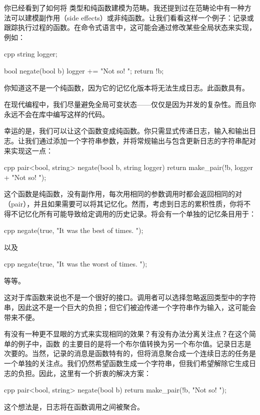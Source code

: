 
\lettrine[lhang=0.17]{你}{已经看到了如何将} 类型和纯函数建模为范畴。我还提到过在范畴论中有一种方法可以建模副作用（side effects）或非纯函数。让我们看看这样一个例子：记录或跟踪执行过程的函数。在命令式语言中，这可能会通过修改某些全局状态来实现，例如：

\begin{snip}{cpp}
  string logger;

  bool negate(bool b) {
    logger += "Not so! ";
    return !b;
  }
\end{snip}
你知道这不是一个纯函数，因为它的记忆化版本将无法生成日志。此函数具有。

在现代编程中，我们尽量避免全局可变状态——仅仅是因为并发的复杂性。而且你永远不会在库中编写这样的代码。

幸运的是，我们可以让这个函数变成纯函数。你只需显式传递日志，输入和输出日志。让我们通过添加一个字符串参数，并将常规输出与包含更新日志的字符串配对来实现这一点：

\begin{snip}{cpp}
  pair<bool, string> negate(bool b, string logger) {
    return make_pair(!b, logger + "Not so! ");
  }
\end{snip}
这个函数是纯函数，没有副作用，每次用相同的参数调用时都会返回相同的对（pair），并且如果需要可以将其记忆化。然而，考虑到日志的累积性质，你将不得不记忆化所有可能导致给定调用的历史记录。将会有一个单独的记忆条目用于：

\begin{snip}{cpp}
  negate(true, "It was the best of times. ");
\end{snip}
以及

\begin{snip}{cpp}
  negate(true, "It was the worst of times. ");
\end{snip}
等等。

这对于库函数来说也不是一个很好的接口。调用者可以选择忽略返回类型中的字符串，因此这不是一个巨大的负担；但它们被迫传递一个字符串作为输入，这可能会带来不便。

有没有一种更不显眼的方式来实现相同的效果？有没有办法分离关注点？在这个简单的例子中，函数  的主要目的是将一个布尔值转换为另一个布尔值。记录日志是次要的。当然，记录的消息是函数特有的，但将消息聚合成一个连续日志的任务是一个单独的关注点。我们仍然希望函数生成一个字符串，但我们希望解除它生成日志的负担。因此，这里有一个折衷的解决方案：

\begin{snip}{cpp}
  pair<bool, string> negate(bool b) {
    return make_pair(!b, "Not so! ");
  }
\end{snip}
这个想法是，日志将在函数调用之间被聚合。

